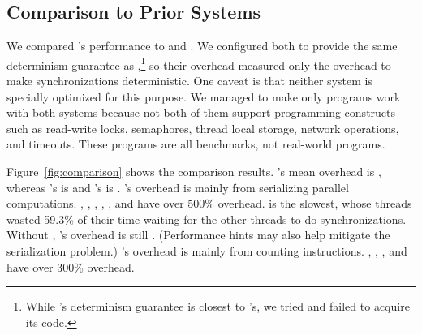 
\subsection{Comparison to Prior Systems} \label{sec:comparison}

We compared \parrot's performance to \dthreads and \coredet.  We configured
both to provide the same determinism guarantee as \parrot,\footnote{While
  \kendo's determinism guarantee is closest to \parrot's, we tried and failed
  to acquire its code.}  so their overhead measured only the overhead to
make synchronizations deterministic.  One caveat is that neither system is
specially optimized for this purpose.  We managed to make only
\nprogcompared programs work with both systems because not both of them
support programming constructs such as read-write locks, semaphores,
thread local storage, network operations, and timeouts. These programs are
all benchmarks, not real-world programs.

Figure~\ref{fig:comparison} shows the comparison results.
\parrot's mean overhead is \parrotcompoverhead,
whereas \dthreads's is \dthreadssyncoverhead and \coredet's is
\coredetoverhead. 
\dthreads's overhead is mainly from serializing
parallel computations. \dedup, \ferret, \fluidanimate, 
\barnes, \radiosity, and \raytrace have over 500\%
overhead.  \fluidanimate is the slowest, whose threads wasted 59.3\% of their time
waiting for the other threads to do synchronizations.
Without \fluidanimate, \dthreads's overhead is still
\dthreadssyncoverheadnoflui.  (Performance hints may also help
\dthreads mitigate the serialization problem.)  \coredet's overhead is
mainly from counting instructions. \ferret, \fluidanimate, \barnes, and
\raytrace have over 300\% overhead.

